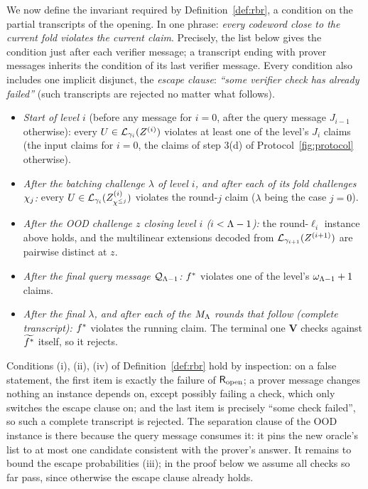 We now define the invariant required by Definition~\ref{def:rbr}, a condition on the partial transcripts of the opening. In one phrase: \emph{every codeword close to the current fold violates the current claim}. Precisely, the list below gives the condition just after each verifier message; a transcript ending with prover messages inherits the condition of its last verifier message. Every condition also includes one implicit disjunct, the \emph{escape clause}: \emph{``some verifier check has already failed''} (such transcripts are rejected no matter what follows).
\begin{itemize}[itemsep=1pt]
\item \emph{Start of level $i$} (before any message for $i = 0$, after the query message $J_{i-1}$ otherwise): every $U \in \mathcal{L}_{\gamma_i}(Z^{(i)})$ violates at least one of the level's $J_i$ claims (the input claims for $i = 0$, the claims of step 3(d) of Protocol~\ref{fig:protocol} otherwise).
\item \emph{After the batching challenge $\lambda$ of level $i$, and after each of its fold challenges $\chi_j$:} every $U \in \mathcal{L}_{\gamma_i}(Z^{(i)}_{\chi^{\le j}})$ violates the round-$j$ claim ($\lambda$ being the case $j = 0$).
\item \emph{After the OOD challenge $z$ closing level $i$ ($i < \Lambda-1$):} the round-$\ell_i$ instance above holds, and the multilinear extensions decoded from $\mathcal{L}_{\gamma_{i+1}}(Z^{(i+1)})$ are pairwise distinct at $z$.
\item \emph{After the final query message $\mathcal{Q}_{\Lambda-1}$:} $f^{\ast}$ violates one of the level's $\omega_{\Lambda-1}+1$ claims.
\item \emph{After the final $\lambda$, and after each of the $M_\Lambda$ rounds that follow (complete transcript):} $f^{\ast}$ violates the running claim. The terminal one $\mathbf{V}$ checks against $\widetilde{f^{\ast}}$ itself, so it rejects.
\end{itemize}
Conditions (i), (ii), (iv) of Definition~\ref{def:rbr} hold by inspection: on a false statement, the first item is exactly the failure of $\mathsf{R}_{\mathrm{open}}$; a prover message changes nothing an instance depends on, except possibly failing a check, which only switches the escape clause on; and the last item is precisely ``some check failed'', so such a complete transcript is rejected. The separation clause of the OOD instance is there because the query message consumes it: it pins the new oracle's list to at most one candidate consistent with the prover's answer. It remains to bound the escape probabilities (iii); in the proof below we assume all checks so far pass, since otherwise the escape clause already holds.

